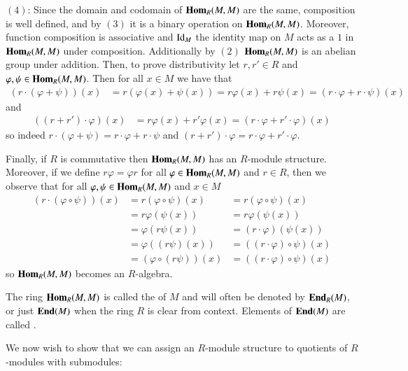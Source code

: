 \documentclass[12pt, a4paper, twoside, openright, titlepage]{book}
\begin{document}
\begin{proof*}{}{}
    $(4)$: Since the domain and codomain of $\mathbf{Hom}_R(M,M)$ are the same, composition is well defined, and by $(3)$ it is a binary operation on $\mathbf{Hom}_R(M,M)$. Moreover, function composition is associative and $\operatorname{Id}_M$ the identity map on $M$ acts as a $1$ in $\mathbf{Hom}_R(M,M)$ under composition. Additionally by $(2)$ $\mathbf{Hom}_R(M,M)$ is an abelian group under addition. Then, to prove distributivity let $r,r' \in R$ and $\varphi,\psi \in \mathbf{Hom}_R(M,M)$. Then for all $x \in M$ we have that \begin{align*}
        (r\cdot(\varphi+\psi))(x) &= r(\varphi(x)+\psi(x)) = r\varphi(x)+r\psi(x) = (r\cdot\varphi+r\cdot\psi)(x)
    \end{align*}
    and \begin{align*}
        ((r+r')\cdot\varphi)(x) &= r\varphi(x)+r'\varphi(x) = (r\cdot\varphi+r'\cdot\varphi)(x)
    \end{align*}
    so indeed $r\cdot(\varphi+\psi) = r\cdot\varphi+r\cdot\psi$ and $(r+r')\cdot\varphi = r\cdot\varphi+r'\cdot\varphi$.
    
    Finally, if $R$ is commutative then $\mathbf{Hom}_R(M,M)$ has an $R$-module structure. Moreover, if we define $r\varphi = \varphi r$ for all $\varphi \in \mathbf{Hom}_R(M,M)$ and $r \in R$, then we observe that for all $\varphi,\psi \in \mathbf{Hom}_R(M,M)$ and $x \in M$ \begin{align*}
        (r\cdot(\varphi\circ\psi))(x) &=r(\varphi\circ\psi)(x) &= r(\varphi\circ\psi)(x) \\
        &=r\varphi(\psi(x))  &= r\varphi(\psi(x)) \\ 
        &= \varphi(r\psi(x)) &= (r\cdot\varphi)(\psi(x)) \\
        &= \varphi((r\psi)(x)) &= ((r\cdot\varphi)\circ\psi)(x) \\
        &= (\varphi\circ(r\psi))(x) &= ((r\cdot\varphi)\circ\psi)(x) 
    \end{align*}
    so $\mathbf{Hom}_R(M,M)$ becomes an $R$-algebra.
\end{proof*}


\begin{defn}{}{}
    The ring $\mathbf{Hom}_R(M,M)$ is called the  of $M$ and will often be denoted by $\normalfont\textbf{End}_R(M)$, or just $\normalfont\textbf{End}(M)$ when the ring $R$ is clear from context. Elements of $\normalfont\textbf{End}(M)$ are called .
\end{defn}

We now wish to show that we can assign an $R$-module structure to quotients of $R$-modules with submodules:
\end{document}
